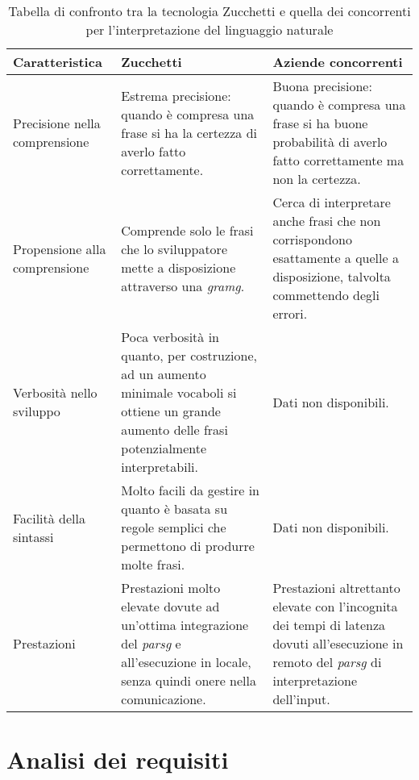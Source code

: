 \begin{table}
	\begin{tabularx}{\textwidth}{|X|X|X|}
		\hline
		\textbf{Caratteristica} & \textbf{Zucchetti} & \textbf{Aziende concorrenti} \\\hline
		
		Precisione nella comprensione & Estrema precisione: quando è compresa una frase si ha la certezza di averlo fatto correttamente.  & Buona precisione: quando è compresa una frase si ha buone probabilità di averlo fatto correttamente ma non la certezza. \\
		\hline
		Propensione alla comprensione & Comprende solo le frasi che lo sviluppatore mette a disposizione attraverso una \emph{\gls{gramg}}. & Cerca di interpretare anche frasi che non corrispondono esattamente a quelle a disposizione, talvolta commettendo degli errori. \\
		\hline
		Verbosità nello sviluppo & Poca verbosità in quanto, per costruzione, ad un aumento minimale vocaboli si ottiene un grande aumento delle frasi potenzialmente interpretabili. & Dati non disponibili. \\
		\hline
		Facilità della sintassi & Molto facili da gestire in quanto è basata su regole semplici che permettono di produrre molte frasi. & Dati non disponibili. \\
		\hline
		Prestazioni & Prestazioni molto elevate dovute ad un'ottima integrazione del \emph{\gls{parsg}} e all'esecuzione in locale, senza quindi onere nella comunicazione. & Prestazioni altrettanto elevate con l'incognita dei tempi di latenza dovuti all'esecuzione in remoto del \emph{\gls{parsg}} di interpretazione dell'input. \\
		\hline
	\end{tabularx}
	\caption{Tabella di confronto tra la tecnologia Zucchetti e quella dei concorrenti per l'interpretazione del linguaggio naturale}
\end{table}

\section{Analisi dei requisiti}
